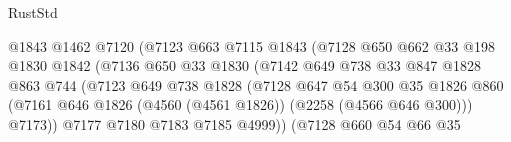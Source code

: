 \begin{lexlean}{RustStd}
\begin{coremodule}
                                    @1843
                                    @1462
                                    @7120
                                    (@7123
                                      @663
                                      @7115
                                      @1843
                                      (@7128
                                        @650
                                        @662
                                        @33
                                        @198
                                        @1830
                                        @1842
                                        (@7136
                                          @650
                                          @33
                                          @1830
                                          (@7142
                                            @649
                                            @738
                                            @33
                                            @847
                                            @1828
                                            @863
                                            @744
                                            (@7123
                                              @649
                                              @738
                                              @1828
                                              (@7128
                                                @647
                                                @54
                                                @300
                                                @35
                                                @1826
                                                @860
                                                (@7161
                                                  @646
                                                  @1826
                                                  (@4560 (@4561 @1826))
                                                  (@2258 (@4566 @646 @300)))
                                                @7173))
                                            @7177
                                            @7180
                                            @7183
                                            @7185
                                            @4999))
                                        (@7128
                                          @660
                                          @54
                                          @66
                                          @35

\end{coremodule}
\end{lexlean}
